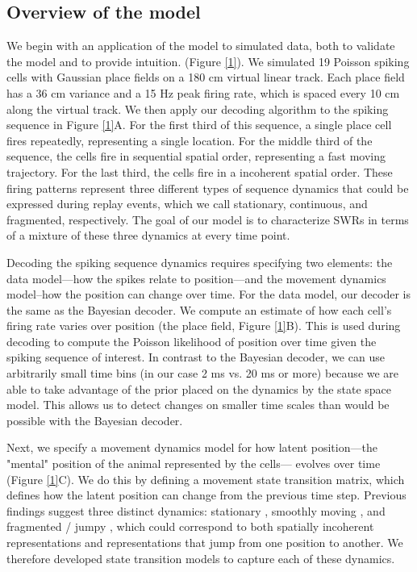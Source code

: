 \documentclass[times, twoside]{zHenriquesLab-StyleBioRxiv}
\begin{document}
\subsection*{Overview of the model}
We begin with an application of the model to simulated data, both to validate the model and to provide intuition. (Figure \ref{1}). We simulated 19 Poisson spiking cells with Gaussian place fields on a 180 cm virtual linear track. Each place field has a 36 cm variance and a 15 Hz peak firing rate, which is spaced every 10 cm along the virtual track. We then apply our decoding algorithm to the spiking sequence in Figure \ref{1}A. For the first third of this sequence, a single place cell fires repeatedly, representing a single location. For the middle third of the sequence, the cells fire in sequential spatial order, representing a fast moving trajectory. For the last third, the cells fire in a incoherent spatial order. These firing patterns represent three different types of sequence dynamics that could be expressed during replay events, which we call stationary, continuous, and fragmented, respectively. The goal of our model is to characterize SWRs in terms of a mixture of these three dynamics at every time point.

Decoding the spiking sequence dynamics requires specifying two elements: the data model---how the spikes relate to position---and the movement dynamics model--how the position can change over time. For the data model, our decoder is the same as the Bayesian decoder. We compute an estimate of how each cell's firing rate varies over position (the place field, Figure \ref{1}B). This is used during decoding to compute the Poisson likelihood of position over time given the spiking sequence of interest. In contrast to the Bayesian decoder, we can use arbitrarily small time bins (in our case 2 ms vs. 20 ms or more) because we are able to take advantage of the prior placed on the dynamics by the state space model. This allows us to detect changes on smaller time scales than would be possible with the Bayesian decoder.

Next, we specify a movement dynamics model for how latent position---the "mental" position of the animal represented by the cells--- evolves over time (Figure \ref{1}C). We do this by defining a movement state transition matrix, which defines how the latent position can change from the previous time step. Previous findings suggest three distinct dynamics: stationary \cite{JaiDistincthippocampalcorticalmemory2017, FarooqEmergencepreconfiguredplastic2019}, smoothly moving \cite{DavidsonHippocampalReplayExtended2009}, and fragmented / jumpy \cite{PfeifferAutoassociativedynamicsgeneration2015}, which could correspond to both spatially incoherent representations and representations that jump from one position to another. We therefore developed state transition models to capture each of these dynamics.
\end{document}
